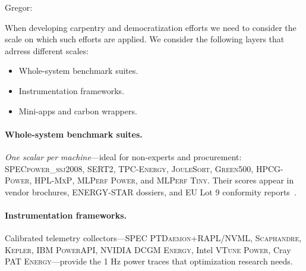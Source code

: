 

Gregor: 

When developing carpentry and democratization efforts we need to consider the scale on which such efforts are applied.
We consider the following layers that adrress different scales:

\begin{itemize}
\item Whole-system benchmark suites. 
\item Instrumentation frameworks. 
\item Mini-apps and carbon wrappers. 
\end{itemize}



\paragraph{Whole-system benchmark suites.}


\emph{One scalar per machine}—ideal for non-experts and procurement:
\textsc{SPECpower\_ssj2008}, \textsc{SERT2}, \textsc{TPC-Energy}, \textsc{JouleSort}, \textsc{Green500}, \textsc{HPCG-Power}, \textsc{HPL-MxP}, \textsc{MLPerf Power}, and \textsc{MLPerf Tiny}.
Their scores appear in vendor brochures, ENERGY-STAR dossiers, and EU Lot 9 conformity reports~\cite{EU_Lot9_Guidance}. %

\paragraph{Instrumentation frameworks.}

Calibrated telemetry collectors—\textsc{SPEC PTDaemon}+RAPL/NVML, \textsc{Scaphandre}, \textsc{Kepler}, IBM \textsc{PowerAPI}, NVIDIA
\textsc{DCGM Energy}, Intel \textsc{VTune Power}, Cray \textsc{PAT Energy}—provide the 1 Hz power traces that optimization research needs.

